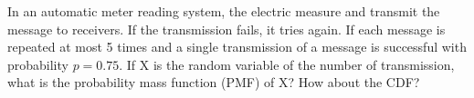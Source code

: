 \documentclass[10pt]{exam}
\begin{document}
\begin{questions}

\question In an automatic meter reading system, the electric measure and 
transmit the message to receivers. If the transmission fails, it tries again. 
If each message is repeated at most 5 times and a single transmission of a 
message is successful with probability $p=0.75$. If X is the random variable of 
the number of transmission, what is the probability mass function (PMF) of X? How about the CDF?



\end{questions}
\end{document}
